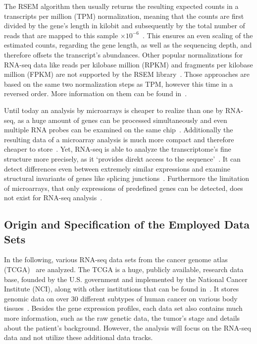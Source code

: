 The RSEM algorithm then usually returns the resulting expected counts in a transcripts per million (TPM) normalization,
meaning that the counts are first divided by the gene's length in kilobit and subsequently
by the total number of reads that are mapped to this sample \(\times 10^{-6}\)~\citep{zhao, li11}.
This ensures an even scaling of the estimated counts, regarding the gene length, as well as the sequencing depth, and
therefore offsets the transcript's abundances.
Other popular normalizations for RNA-seq data like reads per kilobase million (RPKM) and fragments per kilobase million (FPKM) are not supported by the RSEM library~\citep{li11}.
Those approaches are based on the same two normalization steps as TPM, however this time in a reversed order.
More information on them can be found in~\cite{zhao}.

Until today an analysis by microarrays is cheaper to realize than one by RNA-seq,
as a huge amount of genes can be processed simultaneously
and even multiple RNA probes can be examined on the same chip~\citep{guo13}.
Additionally the resulting data of a microarray analysis is much more compact and therefore cheaper to store~\citep{malone}.
Yet, RNA-seq is able to analyze the transcriptome's fine structure more precisely, as it `provides direkt access to the sequence'~\citep[p.35]{malone}.
It can detect differences even between extremely similar expressions and examine structural invariants of genes like
splicing junctions~\citep{guo13, malone, wang09}.
Furthermore the limitation of microarrays, that only expressions of predefined genes can
be detected, does not exist for RNA-seq analysis~\citep{guo13, malone}.

\subsection{Origin and Specification of the Employed Data Sets}

In the following, various RNA-seq data sets from the cancer genome atlas (TCGA)~\citep{tcga08} are analyzed.
The TCGA is a huge, publicly available, research data base, founded by the U.S. government and implemented by the National Cancer Institute (NCI),
along with other institutions that can be found in~\cite{weinstein}.
It stores genomic data on over 30 different subtypes of human cancer on various body tissues~\citep{weinstein, guo13}.
Besides the gene expression profiles, each data set also contains much more information, such as the raw genetic data, the tumor's stage and details about the patient's background.
However, the analysis will focus on the RNA-seq data and not utilize these additional data tracks.

